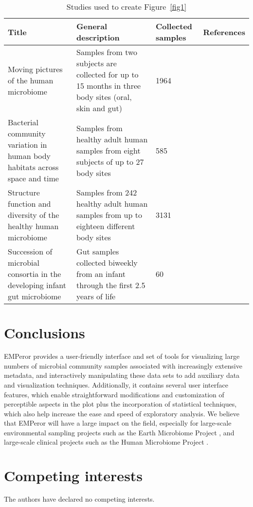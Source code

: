 \begin{sidewaystable}[htbp]
\centering
\caption{Studies used to create Figure~\ref{fig1}}
\label{tab1}
\begin{tabular}{m{7cm}m{10cm}MM}
\toprule
Title   & General description  & Collected samples & References  \\
\midrule
Moving pictures of the human microbiome & Samples from two subjects are collected for up to 15 months in three body sites (oral, skin and gut) & 1964  & \cite{RN85,RN82} \\
\midrule
Bacterial community variation in human body habitats across space and time & Samples from   healthy adult human samples from eight subjects of up to 27 body sites & 585   & \cite{RN129} \rule{0pt}{3ex} \\
\midrule
Structure function and diversity of the healthy human microbiome & Samples from 242 healthy adult human samples from up to eighteen different body sites & 3131  & \cite{RN35} \rule{0pt}{3ex}\\
\midrule
Succession of microbial consortia in the developing infant gut microbiome & Gut samples collected biweekly from an infant through the first 2.5 years of life  & 60  & \cite{RN11}\rule{0pt}{3ex}\\
\bottomrule
\end{tabular}
\end{sidewaystable}

\section{Conclusions}
EMPeror provides a user-friendly interface and set of tools for visualizing large numbers of microbial community samples associated with increasingly extensive metadata, and interactively manipulating these data sets to add auxiliary data and visualization techniques. Additionally, it contains several user interface features, which enable straightforward modifications and customization of perceptible aspects in the plot plus the incorporation of statistical techniques, which also help increase the ease and speed of exploratory analysis. We believe that EMPeror will have a large impact on the field, especially for large-scale environmental sampling projects such as the Earth Microbiome Project \cite{RN10}, and large-scale clinical projects such as the Human Microbiome Project \cite{RN35}.

\section{Competing interests}
The authors have declared no competing interests.

